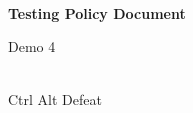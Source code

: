 \begin{titlepage}
    \centering



    \vspace{2cm}
    \hrulefill\\
    \vspace{1cm}
    {\Huge\bfseries Testing Policy Document}

    \vspace{1cm}

    {\Large Demo 4}\\
    \vspace{1cm}
    \hrulefill\\

    \vfill

    {\large Ctrl Alt Defeat}

    \vspace{1cm}


\end{titlepage}